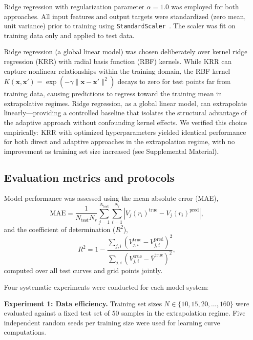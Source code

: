 \documentclass[aps,prb,twocolumn,superscriptaddress,longbibliography,floatfix]{revtex4-2}
\begin{document}
Ridge regression with regularization parameter $\alpha = 1.0$ was employed for both approaches. All input features and output targets were standardized (zero mean, unit variance) prior to training using \texttt{StandardScaler}~\cite{Pedregosa2011}. The scaler was fit on training data only and applied to test data.

Ridge regression (a global linear model) was chosen deliberately over kernel ridge regression (KRR) with radial basis function (RBF) kernels. While KRR can capture nonlinear relationships within the training domain, the RBF kernel $K(\mathbf{x}, \mathbf{x}') = \exp(-\gamma\|\mathbf{x} - \mathbf{x}'\|^2)$ decays to zero for test points far from training data, causing predictions to regress toward the training mean in extrapolative regimes. Ridge regression, as a global linear model, can extrapolate linearly---providing a controlled baseline that isolates the structural advantage of the adaptive approach without confounding kernel effects. We verified this choice empirically: KRR with optimized hyperparameters yielded identical performance for both direct and adaptive approaches in the extrapolation regime, with no improvement as training set size increased (see Supplemental Material).

\subsection{Evaluation metrics and protocols}
\label{sec:evaluation}

Model performance was assessed using the mean absolute error (MAE),
\begin{equation}
  \mathrm{MAE} = \frac{1}{N_\mathrm{test} N_r} \sum_{j=1}^{N_\mathrm{test}} \sum_{i=1}^{N_r} |V_j(r_i)^\mathrm{true} - V_j(r_i)^\mathrm{pred}|,
\end{equation}
and the coefficient of determination ($R^2$),
\begin{equation}
  R^2 = 1 - \frac{\sum_{j,i}(V_{j,i}^\mathrm{true} - V_{j,i}^\mathrm{pred})^2}{\sum_{j,i}(V_{j,i}^\mathrm{true} - \bar{V}^\mathrm{true})^2},
\end{equation}
computed over all test curves and grid points jointly.

Four systematic experiments were conducted for each model system:

\textbf{Experiment 1: Data efficiency.} Training set sizes $N \in \{10, 15, 20, \ldots, 160\}$ were evaluated against a fixed test set of 50 samples in the extrapolation regime. Five independent random seeds per training size were used for learning curve computations.
\end{document}
